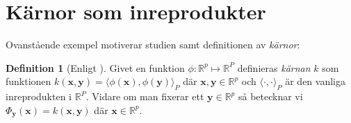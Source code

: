 \documentclass[a4paper, 12pt]{report}
\theoremstyle{definition}
\newtheorem{defi}{Definition}[section]
\theoremstyle{remark}
\newcommand{\bfx}{\mathbf{x}}
\newcommand{\bfy}{\mathbf{y}}
\begin{document}



\section{Kärnor som inreprodukter}

Ovanstående exempel motiverar studien samt definitionen av \emph{kärnor}:
\begin{defi}[Enligt \cite{LearningKernels}]\label{def:kärna}
	Givet en funktion $\phi: \mathbb{R}^p \longmapsto \mathbb{R}^P$ definieras \emph{kärnan} $k$ som funktionen $k\left(\bfx, \bfy\right) = \langle \phi \left(\bfx\right), \phi\left(\bfy\right) \rangle_P$ där $\bfx, \bfy \in \mathbb{R}^p$ och $\langle \cdot, \cdot \rangle_P$ är den vanliga inreprodukten i $\mathbb{R}^P$.
	Vidare om man fixerar ett $\bfy\in\mathbb{R}^p$ så betecknar vi $\Phi_{\bfy}\left(\bfx\right) = k\left(\bfx, \bfy\right)$ där $\bfx\in\mathbb{R}^p$.
\end{defi}
\end{document}
